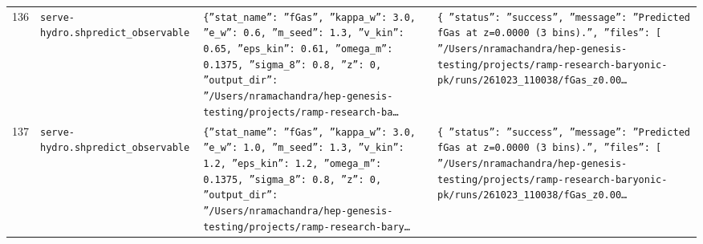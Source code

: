 \documentclass[11pt,a4paper]{article}
\begin{document}
\begin{longtable}{@{}p{}p{}p{}p{}@{}}
136 & \texttt{serve-hydro.sh}\newline\texttt{predict\_\allowbreak{}observable} & \texttt{\{''stat\_\allowbreak{}name'':\allowbreak{} ''fGas'',\allowbreak{} ''kappa\_\allowbreak{}w'':\allowbreak{} 3.0,\allowbreak{} ''e\_\allowbreak{}w'':\allowbreak{} 0.6,\allowbreak{} ''m\_\allowbreak{}seed'':\allowbreak{} 1.3,\allowbreak{} ''v\_\allowbreak{}kin'':\allowbreak{} 0.65,\allowbreak{} ''eps\_\allowbreak{}kin'':\allowbreak{} 0.61,\allowbreak{} ''omega\_\allowbreak{}m'':\allowbreak{} 0.1375,\allowbreak{} ''sigma\_\allowbreak{}8'':\allowbreak{} 0.8,\allowbreak{} ''z'':\allowbreak{} 0,\allowbreak{} ''output\_\allowbreak{}dir'':\allowbreak{} ''/\allowbreak{}Users/\allowbreak{}nramachandra/\allowbreak{}hep-genesis-testing/\allowbreak{}projects/\allowbreak{}ramp-research-ba\ldots{}\allowbreak{}} & \texttt{\{   ''status'':\allowbreak{} ''success'',\allowbreak{}   ''message'':\allowbreak{} ''Predicted fGas at z=\allowbreak{}0.0000 (3 bins)\allowbreak{}.'',\allowbreak{}   ''files'':\allowbreak{} [     ''/\allowbreak{}Users/\allowbreak{}nramachandra/\allowbreak{}hep-genesis-testing/\allowbreak{}projects/\allowbreak{}ramp-research-baryonic-pk/\allowbreak{}runs/\allowbreak{}261023\_\allowbreak{}110038/\allowbreak{}fGas\_\allowbreak{}z0.00\ldots{}\allowbreak{}} \\
137 & \texttt{serve-hydro.sh}\newline\texttt{predict\_\allowbreak{}observable} & \texttt{\{''stat\_\allowbreak{}name'':\allowbreak{} ''fGas'',\allowbreak{} ''kappa\_\allowbreak{}w'':\allowbreak{} 3.0,\allowbreak{} ''e\_\allowbreak{}w'':\allowbreak{} 1.0,\allowbreak{} ''m\_\allowbreak{}seed'':\allowbreak{} 1.3,\allowbreak{} ''v\_\allowbreak{}kin'':\allowbreak{} 1.2,\allowbreak{} ''eps\_\allowbreak{}kin'':\allowbreak{} 1.2,\allowbreak{} ''omega\_\allowbreak{}m'':\allowbreak{} 0.1375,\allowbreak{} ''sigma\_\allowbreak{}8'':\allowbreak{} 0.8,\allowbreak{} ''z'':\allowbreak{} 0,\allowbreak{} ''output\_\allowbreak{}dir'':\allowbreak{} ''/\allowbreak{}Users/\allowbreak{}nramachandra/\allowbreak{}hep-genesis-testing/\allowbreak{}projects/\allowbreak{}ramp-research-bary\ldots{}\allowbreak{}} & \texttt{\{   ''status'':\allowbreak{} ''success'',\allowbreak{}   ''message'':\allowbreak{} ''Predicted fGas at z=\allowbreak{}0.0000 (3 bins)\allowbreak{}.'',\allowbreak{}   ''files'':\allowbreak{} [     ''/\allowbreak{}Users/\allowbreak{}nramachandra/\allowbreak{}hep-genesis-testing/\allowbreak{}projects/\allowbreak{}ramp-research-baryonic-pk/\allowbreak{}runs/\allowbreak{}261023\_\allowbreak{}110038/\allowbreak{}fGas\_\allowbreak{}z0.00\ldots{}\allowbreak{}} \\

\end{longtable}
\end{document}
